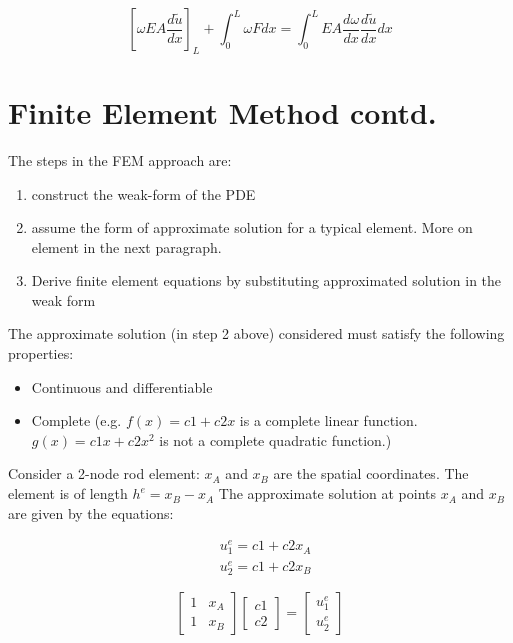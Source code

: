 \documentclass[10pt]{article}
\begin{document}
$$
\left[\omega E A \frac{d \tilde{u}}{d x}\right]_{L}+\int_{0}^{L} \omega F d x=\int_{0}^{L} E A \frac{d \omega}{d x} \frac{d \tilde{u}}{d x} d x
$$

\newpage
\section{ Finite Element Method contd.}

The steps in the FEM approach are:

\begin{enumerate}
  \item construct the weak-form of the PDE

  \item assume the form of approximate solution for a typical element. More on element in the next paragraph.

  \item Derive finite element equations by substituting approximated solution in the weak form

\end{enumerate}

The approximate solution (in step 2 above) considered must satisfy the following properties:

\begin{itemize}
  \item Continuous and differentiable

  \item Complete (e.g. $f(x)=c 1+c 2 x$ is a complete linear function.\\ $g(x)=c 1 x+c 2 x^{2}$ is not a complete quadratic function.)

\end{itemize}

Consider a 2-node rod element:
$x_{A}$ and $x_{B}$ are the spatial coordinates. The element is of length $h^{e}=x_{B}-x_{A}$
The approximate solution at points $x_A$ and $x_B$ are given by the equations:

$$
\begin{aligned}
& u_{1}^{e}=c 1+c 2 x_{A} \\
& u_{2}^{e}=c 1+c 2 x_{B}
\end{aligned}
$$

$$
\left[\begin{array}{ll}
1 & x_{A} \\
1 & x_{B}
\end{array}\right]\left[\begin{array}{l}
c 1 \\
c 2
\end{array}\right]=\left[\begin{array}{l}
u_{1}^{e} \\
u_{2}^{e}
\end{array}\right]
$$
\end{document}
